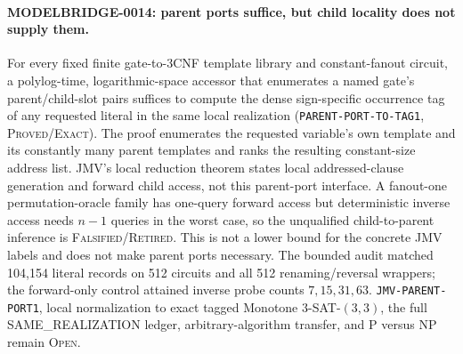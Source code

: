 \paragraph{MODELBRIDGE-0014: parent ports suffice, but child locality does not supply them.}
For every fixed finite gate-to-3CNF template library and constant-fanout
circuit, a polylog-time, logarithmic-space accessor that enumerates a named
gate's parent/child-slot pairs suffices to compute the dense sign-specific
occurrence tag of any requested literal in the same local realization
(\texttt{PARENT-PORT-TO-TAG1}, \textsc{Proved/Exact}).  The proof enumerates
the requested variable's own template and its constantly many parent
templates and ranks the resulting constant-size address list.  JMV's local
reduction theorem states local addressed-clause generation and forward child
access, not this parent-port interface.  A fanout-one permutation-oracle
family has one-query forward access but deterministic inverse access needs
$n-1$ queries in the worst case, so the unqualified child-to-parent inference
is \textsc{Falsified/Retired}.  This is not a lower bound for the concrete JMV
labels and does not make parent ports necessary.  The bounded audit matched
104,154 literal records on 512 circuits and all 512 renaming/reversal wrappers;
the forward-only control attained inverse probe counts $7,15,31,63$.
\texttt{JMV-PARENT-PORT1}, local normalization to exact tagged Monotone
$3$-SAT-$(3,3)$, the full SAME\_REALIZATION ledger, arbitrary-algorithm
transfer, and P versus NP remain \textsc{Open}.


